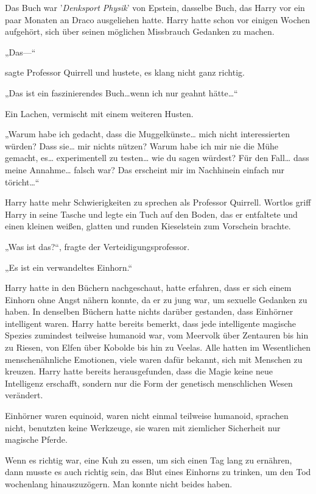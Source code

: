 {Das Buch war '\emph{Denksport Physik}' von Epstein, dasselbe Buch, das Harry vor ein paar Monaten an Draco ausgeliehen hatte. Harry hatte schon vor einigen Wochen aufgehört, sich über seinen möglichen Missbrauch Gedanken zu machen.

„Das—“

sagte Professor Quirrell und hustete, es klang nicht ganz richtig.

„Das ist ein faszinierendes Buch…wenn ich nur geahnt hätte…“

Ein Lachen, vermischt mit einem weiteren Husten.

„Warum habe ich gedacht, dass die Muggelkünste… mich nicht interessierten würden? Dass sie… mir nichts nützen? Warum habe ich mir nie die Mühe gemacht, es… experimentell zu testen… wie du sagen würdest? Für den Fall… dass meine Annahme… falsch war? Das erscheint mir im Nachhinein einfach nur töricht…“

Harry hatte mehr Schwierigkeiten zu sprechen als Professor Quirrell. Wortlos griff Harry in seine Tasche und legte ein Tuch auf den Boden, das er entfaltete und einen kleinen weißen, glatten und runden Kieselstein zum Vorschein brachte.

„Was ist das?“, fragte der Verteidigungsprofessor.

„Es ist ein verwandeltes Einhorn.“

Harry hatte in den Büchern nachgeschaut, hatte erfahren, dass er sich einem Einhorn ohne Angst nähern konnte, da er zu jung war, um sexuelle Gedanken zu haben. In denselben Büchern hatte nichts darüber gestanden, dass Einhörner intelligent waren. Harry hatte bereits bemerkt, dass jede intelligente magische Spezies zumindest teilweise humanoid war, vom Meervolk über Zentauren bis hin zu Riesen, von Elfen über Kobolde bis hin zu Veelas. Alle hatten im Wesentlichen menschenähnliche Emotionen, viele waren dafür bekannt, sich mit Menschen zu kreuzen. Harry hatte bereits herausgefunden, dass die Magie keine neue Intelligenz erschafft, sondern nur die Form der genetisch menschlichen Wesen verändert.

Einhörner waren equinoid, waren nicht einmal teilweise humanoid, sprachen nicht, benutzten keine Werkzeuge, sie waren mit ziemlicher Sicherheit nur magische Pferde.

Wenn es richtig war, eine Kuh zu essen, um sich einen Tag lang zu ernähren, dann musste es auch richtig sein, das Blut eines Einhorns zu trinken, um den Tod wochenlang hinauszuzögern. Man konnte nicht beides haben.

}
